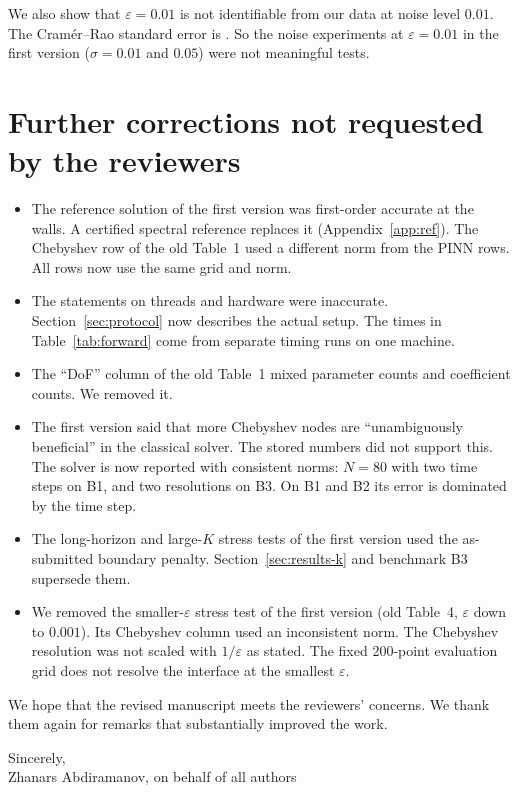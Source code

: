 \documentclass[11pt]{article}
\begin{document}
We also show that $\varepsilon=0.01$ is not identifiable from our data at noise level $0.01$. The Cram\'er--Rao standard error is . So the noise experiments at $\varepsilon=0.01$ in the first version ($\sigma=0.01$ and $0.05$) were not meaningful tests.

\section*{Further corrections not requested by the reviewers}

\begin{itemize}[leftmargin=*,itemsep=2pt]
\item The reference solution of the first version was first-order accurate at the walls. A certified spectral reference replaces it (Appendix~\ref{app:ref}). The Chebyshev row of the old Table~1 used a different norm from the PINN rows. All rows now use the same grid and norm.
\item The statements on threads and hardware were inaccurate. Section~\ref{sec:protocol} now describes the actual setup. The times in Table~\ref{tab:forward} come from separate timing runs on one machine.
\item The ``DoF'' column of the old Table~1 mixed parameter counts and coefficient counts. We removed it.
\item The first version said that more Chebyshev nodes are ``unambiguously beneficial'' in the classical solver. The stored numbers did not support this. The solver is now reported with consistent norms: $N=80$ with two time steps on B1, and two resolutions on B3. On B1 and B2 its error is dominated by the time step.
\item The long-horizon and large-$K$ stress tests of the first version used the as-submitted boundary penalty. Section~\ref{sec:results-k} and benchmark B3 supersede them.
\item We removed the smaller-$\varepsilon$ stress test of the first version (old Table~4, $\varepsilon$ down to $0.001$). Its Chebyshev column used an inconsistent norm. The Chebyshev resolution was not scaled with $1/\varepsilon$ as stated. The fixed 200-point evaluation grid does not resolve the interface at the smallest $\varepsilon$.
\end{itemize}

We hope that the revised manuscript meets the reviewers' concerns. We thank them again for remarks that substantially improved the work.

\medskip
Sincerely,\\
Zhanars Abdiramanov, on behalf of all authors
\end{document}

